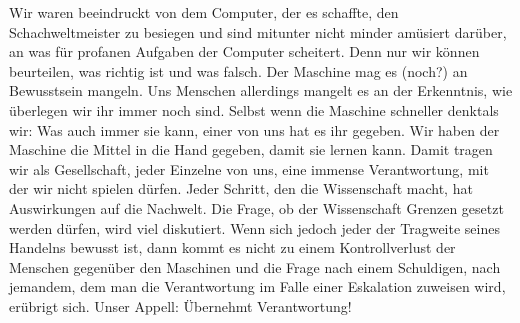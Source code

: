 Wir waren beeindruckt von dem Computer, der es schaffte, den Schachweltmeister zu besiegen und sind mitunter nicht minder amüsiert darüber, an was für profanen Aufgaben der Computer scheitert.  Denn nur wir können beurteilen, was richtig ist und was falsch. Der Maschine mag es (noch?) an Bewusstsein mangeln. Uns Menschen allerdings mangelt es an der Erkenntnis, wie überlegen wir ihr immer noch sind. Selbst wenn die Maschine schneller \glqq denkt\grqq  als wir: Was auch immer sie kann, einer von uns hat es ihr gegeben. Wir haben der Maschine die Mittel in die Hand gegeben, damit sie lernen kann. Damit tragen wir als Gesellschaft, jeder Einzelne von uns, eine immense Verantwortung, mit der wir nicht spielen dürfen. Jeder Schritt, den die Wissenschaft macht, hat Auswirkungen auf die Nachwelt. Die Frage, ob der Wissenschaft Grenzen gesetzt werden dürfen, wird viel diskutiert. Wenn sich jedoch jeder der Tragweite seines Handelns bewusst ist, dann kommt es nicht zu einem Kontrollverlust der Menschen gegenüber den Maschinen und die Frage nach einem Schuldigen, nach jemandem, dem man die Verantwortung im Falle einer Eskalation zuweisen wird, erübrigt sich. Unser Appell: Übernehmt Verantwortung!
